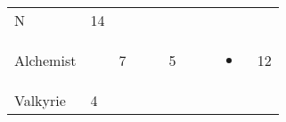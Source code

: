 \documentclass[12pt]{article}
\begin{document}
\begin{longtable}[]{@{}llllllllll@{}}
\begin{minipage}[t]{0.07\columnwidth}\raggedright\strut
N
\strut\end{minipage} &
\begin{minipage}[t]{0.08\columnwidth}\raggedright\strut
14
\strut\end{minipage}\tabularnewline
\begin{minipage}[t]{0.13\columnwidth}\raggedright\strut
Alchemist
\strut\end{minipage} &
\begin{minipage}[t]{0.06\columnwidth}\raggedright\strut
\strut\end{minipage} &
\begin{minipage}[t]{0.06\columnwidth}\raggedright\strut
7
\strut\end{minipage} &
\begin{minipage}[t]{0.06\columnwidth}\raggedright\strut
\strut\end{minipage} &
\begin{minipage}[t]{0.06\columnwidth}\raggedright\strut
\strut\end{minipage} &
\begin{minipage}[t]{0.06\columnwidth}\raggedright\strut
5
\strut\end{minipage} &
\begin{minipage}[t]{0.06\columnwidth}\raggedright\strut
\strut\end{minipage} &
\begin{minipage}[t]{0.06\columnwidth}\raggedright\strut
\strut\end{minipage} &
\begin{minipage}[t]{0.07\columnwidth}\raggedright\strut
\begin{itemize}
\item
\end{itemize}
\strut\end{minipage} &
\begin{minipage}[t]{0.08\columnwidth}\raggedright\strut
12
\strut\end{minipage}\tabularnewline
\begin{minipage}[t]{0.13\columnwidth}\raggedright\strut
Valkyrie
\strut\end{minipage} &
\begin{minipage}[t]{0.06\columnwidth}\raggedright\strut
4
\strut\end{minipage} &
\begin{minipage}[t]{0.06\columnwidth}\raggedright\strut
\strut\end{minipage} &

\end{longtable}
\end{document}
